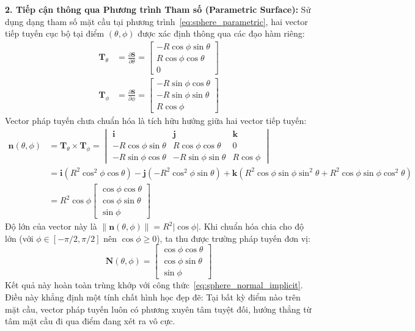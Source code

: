 \textbf{2. Tiếp cận thông qua Phương trình Tham số (Parametric Surface):}
Sử dụng dạng tham số mặt cầu tại phương trình~\eqref{eq:sphere_parametric}, hai vector tiếp tuyến cục bộ tại điểm $(\theta, \phi)$ được xác định thông qua các đạo hàm riêng:
\begin{align}
\mathbf{T}_\theta &= \frac{\partial \mathbf{S}}{\partial \theta} = \begin{bmatrix} -R \cos\phi \sin\theta \\ R \cos\phi \cos\theta \\ 0 \end{bmatrix} \\
\mathbf{T}_\phi &= \frac{\partial \mathbf{S}}{\partial \phi} = \begin{bmatrix} -R \sin\phi \cos\theta \\ -R \sin\phi \sin\theta \\ R \cos\phi \end{bmatrix}
\end{align}
Vector pháp tuyến chưa chuẩn hóa là tích hữu hướng giữa hai vector tiếp tuyến:
\begin{align}
\mathbf{n}(\theta, \phi) &= \mathbf{T}_\theta \times \mathbf{T}_\phi = \begin{vmatrix} \mathbf{i} & \mathbf{j} & \mathbf{k} \\ -R \cos\phi \sin\theta & R \cos\phi \cos\theta & 0 \\ -R \sin\phi \cos\theta & -R \sin\phi \sin\theta & R \cos\phi \end{vmatrix} \nonumber \\
&= \mathbf{i}\left( R^2 \cos^2\phi \cos\theta \right) - \mathbf{j}\left( -R^2 \cos^2\phi \sin\theta \right) + \mathbf{k}\left( R^2 \cos\phi \sin\phi \sin^2\theta + R^2 \cos\phi \sin\phi \cos^2\theta \right) \nonumber \\
&= R^2 \cos\phi \begin{bmatrix} \cos\phi \cos\theta \\ \cos\phi \sin\theta \\ \sin\phi \end{bmatrix}
\end{align}
Độ lớn của vector này là $\|\mathbf{n}(\theta, \phi)\| = R^2 |\cos\phi|$. Khi chuẩn hóa chia cho độ lớn (với $\phi \in [-\pi/2, \pi/2]$ nên $\cos\phi \ge 0$), ta thu được trường pháp tuyến đơn vị:
\begin{equation}
\label{eq:sphere_normal_parametric}
\mathbf{N}(\theta, \phi) = \begin{bmatrix} \cos\phi \cos\theta \\ \cos\phi \sin\theta \\ \sin\phi \end{bmatrix}
\end{equation}
Kết quả này hoàn toàn trùng khớp với công thức~\eqref{eq:sphere_normal_implicit}. Điều này khẳng định một tính chất hình học đẹp đẽ: Tại bất kỳ điểm nào trên mặt cầu, vector pháp tuyến luôn có phương xuyên tâm tuyệt đối, hướng thẳng từ tâm mặt cầu đi qua điểm đang xét ra vô cực.

